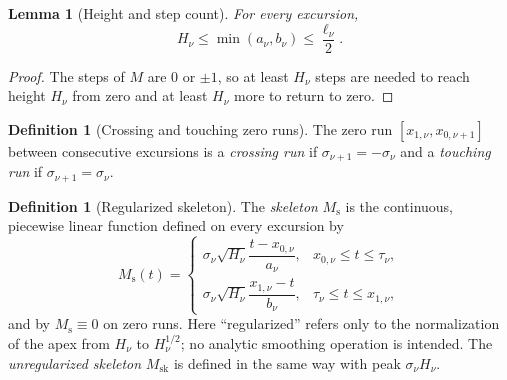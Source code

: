 \documentclass[11pt]{amsart}
\numberwithin{equation}{section}
\theoremstyle{plain}
\newtheorem{lemma}[theorem]{Lemma}
\theoremstyle{definition}
\newtheorem{definition}[theorem]{Definition}
\theoremstyle{remark}
\newcommand{\Ms}{M_{\mathrm{s}}}
\newcommand{\Msk}{M_{\mathrm{sk}}}
\begin{document}
\begin{lemma}[Height and step count]
\label{lem:height_steps}
For every excursion,
\begin{equation}
\label{eq:height_steps}
H_\nu\le\min(a_\nu,b_\nu)\le\frac{\ell_\nu}{2}.
\end{equation}
\end{lemma}

\begin{proof}
The steps of $M$ are $0$ or $\pm1$, so at least $H_\nu$ steps are needed to
reach height $H_\nu$ from zero and at least $H_\nu$ more to return to zero.
\end{proof}

\begin{definition}[Crossing and touching zero runs]
\label{def:crossing_touching}
The zero run $[x_{1,\nu},x_{0,\nu+1}]$ between consecutive excursions is a
\emph{crossing run} if $\sigma_{\nu+1}=-\sigma_\nu$ and a \emph{touching run}
if $\sigma_{\nu+1}=\sigma_\nu$.
\end{definition}

\begin{definition}[Regularized skeleton]
\label{def:Ms}
The \emph{skeleton} $\Ms$ is the continuous, piecewise linear function
defined on every excursion by
\begin{equation}
\label{eq:Ms_def}
\Ms(t)=
\begin{cases}
\sigma_\nu\sqrt{H_\nu}\dfrac{t-x_{0,\nu}}{a_\nu},
 &x_{0,\nu}\le t\le\tau_\nu,\\[2ex]
\sigma_\nu\sqrt{H_\nu}\dfrac{x_{1,\nu}-t}{b_\nu},
 &\tau_\nu\le t\le x_{1,\nu},
\end{cases}
\end{equation}
and by $\Ms\equiv0$ on zero runs.  Here ``regularized'' refers only to
the normalization of the apex from $H_\nu$ to $H_\nu^{1/2}$; no analytic
smoothing operation is intended.  The \emph{unregularized skeleton} $\Msk$
is defined in the same way with peak $\sigma_\nu H_\nu$.
\end{definition}
\end{document}
